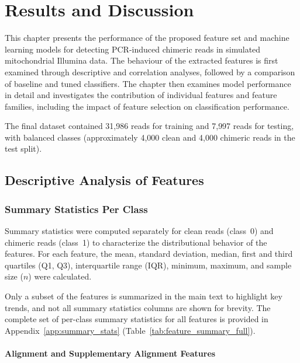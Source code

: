 
\chapter{Results and Discussion}

This chapter presents the performance of the proposed feature set and machine learning models for detecting PCR-induced chimeric reads in simulated mitochondrial Illumina data. The behaviour of the extracted features is first examined through descriptive and correlation analyses, followed by a comparison of baseline and tuned classifiers. The chapter then examines model performance in detail and investigates the contribution of individual features and feature families, including the impact of feature selection on classification performance.

The final dataset contained 31{,}986 reads for training and 7{,}997 reads for testing, with balanced classes (approximately 4{,}000 clean and 4{,}000 chimeric reads in the test split).

\section{Descriptive Analysis of Features}

\subsection{Summary Statistics Per Class}

Summary statistics were computed separately for clean reads (class~0) and chimeric reads (class~1) to characterize the distributional behavior of the features. For each feature, the mean, standard deviation, median, first and third quartiles (Q1, Q3), interquartile range (IQR), minimum, maximum, and sample size (\(n\)) were calculated.

Only a subset of the features is summarized in the main text to highlight key trends, and not all summary statistics columns are shown for brevity. The complete set of per-class summary statistics for all features is provided in Appendix~\ref{app:summary_stats} (Table~\ref{tab:feature_summary_full}).

\subsubsection{Alignment and Supplementary Alignment Features}

